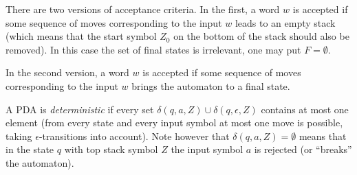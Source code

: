 

\setcounter{section}{6}
\setcounter{subsection}{1}
\setcounter{dfn}{3}


There are two versions of acceptance criteria.
In the first, a word $w$ is accepted if some sequence of moves corresponding to the input $w$ leads to an empty stack
(which means that the start symbol $Z_0$ on the bottom of the stack should also be removed).
In this case the set of final states is irrelevant, one may put $F = \emptyset$.

In the second version, a word $w$ is accepted if some sequence of moves corresponding to the input $w$ brings the automaton to a final state.

A PDA is \emph{deterministic} if every set $\delta(q, a, Z) \cup \delta(q, \epsilon, Z)$ contains at most one element
(from every state and every input symbol at most one move is possible, taking $\epsilon$-transitions into account).
Note however that $\delta(q, a, Z) = \emptyset$ means that in the state $q$ with top stack symbol $Z$
the input symbol $a$ is rejected (or ``breaks'' the automaton).



